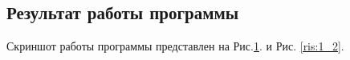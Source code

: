 \documentclass[russian,utf8,pointsection]{eskdtext}
\begin{document}
       	\subsection{Результат работы программы}
       	Скриншот работы программы представлен на Рис.\ref{ris:1_1}. и Рис. \ref{ris:1_2}.
       	\begin{figure}[!h]
       		\caption{}
       		\label{ris:1_1}
       	\end{figure}
\end{document}
